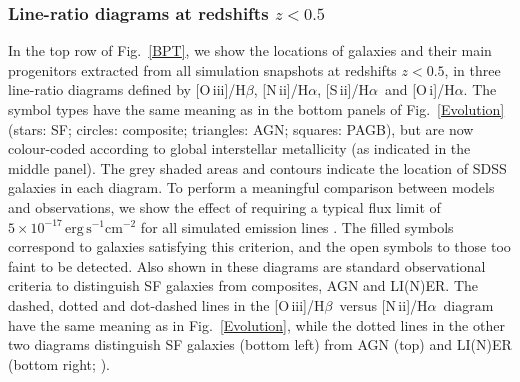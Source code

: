 \documentclass[fleqn,usenatbib]{mnras}
\newcommand{\oiiihb}{\hbox{[O\,{\sc iii}]/H$\beta$}}
\newcommand{\niiha}{\hbox{[N\,{\sc ii}]/H$\alpha$}}
\newcommand{\siiha}{\hbox{[S\,{\sc ii}]/H$\alpha$}}
\newcommand{\oiha}{\hbox{[O\,{\sc i}]/H$\alpha$}}
\begin{document}
\subsubsection{Line-ratio diagrams at redshifts $z<0.5$}\label{lowzBPT}

\begin{figure*}
\centering
{}
 \caption{Average \oiiihb\ emission-line ratio in bins of \niiha\
   (left panel), \siiha\ (middle panel) and \oiha\   (right panel) for the {\it star-forming subset} [i.e., with
   $\log(\mathrm{BHAR/SFR})< -4$] of the 20 simulated massive galaxies of Section~\ref{theory} 
   and their main high-redshift progenitors, in different redshift ranges (connected stars
   of different colours). The SDSS data (in grey) and dashed and dotted lines are the
   same as in Fig.~\ref{BPT}.}\label{BPT_SFoffset}     
\end{figure*}
In the top row of Fig.~\ref{BPT}, we show the locations of galaxies and their main
progenitors extracted from all simulation snapshots at redshifts $z<0.5$, in three line-ratio
diagrams defined by \oiiihb, \niiha, \siiha\ and \oiha. The symbol types have the same
meaning as in the bottom panels of Fig.~\ref{Evolution} (stars: SF; circles: composite;
triangles: AGN; squares: PAGB), but are now colour-coded according to global interstellar metallicity 
(as indicated in the middle panel). The grey shaded areas and contours indicate the location
of SDSS galaxies in each diagram. To perform a meaningful comparison between models and
observations, we show the effect of requiring a typical  flux limit
of $\mathrm{5\times 10^{-17}\,erg\,s^{-1}cm^{-2}}$ for all simulated emission
lines \citep[e.g., table~1 of][]{Juneau14}. The filled symbols correspond to galaxies 
satisfying this criterion, and the open symbols to those too faint to be detected. Also
shown in these diagrams are standard observational criteria to distinguish SF galaxies from 
composites, AGN and LI(N)ER. The dashed, dotted and dot-dashed lines in the \oiiihb\ versus \niiha\
diagram have the same meaning as in Fig.~\ref{Evolution}, while the dotted lines in the other
two diagrams distinguish SF galaxies (bottom left) from AGN (top) and LI(N)ER (bottom right;
\citealt{Kewley01}).
\end{document}
